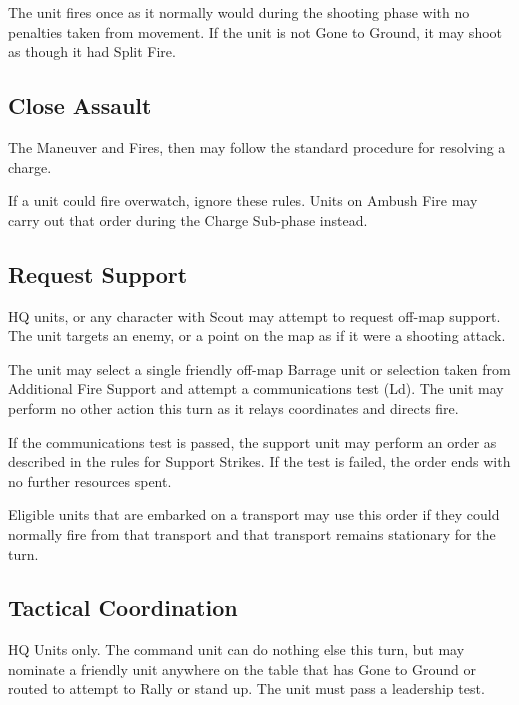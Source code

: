 \documentclass[letterpaper,twocolumn,oneside,titlepage]{book}
\begin{document}
The unit fires once as it normally would during the shooting phase with
no penalties taken from movement. If the unit is not Gone to Ground, it
may shoot as though it had Split Fire.

\subsection{\texorpdfstring{\textbf{Close
Assault}}{Close Assault}}\label{close-assault}

The Maneuver and Fires, then may follow the standard procedure for
resolving a charge.

If a unit could fire overwatch, ignore these rules. Units on Ambush Fire
may carry out that order during the Charge Sub-phase instead.

\subsection{\texorpdfstring{\textbf{Request
Support}}{Request Support}}\label{request-support}

HQ units, or any character with Scout may attempt to request off-map
support. The unit targets an enemy, or a point on the map as if it were
a shooting attack.

The unit may select a single friendly off-map Barrage unit or selection
taken from Additional Fire Support and attempt a communications test
(Ld). The unit may perform no other action this turn as it relays
coordinates and directs fire.

If the communications test is passed, the support unit may perform an
order as described in the rules for Support Strikes. If the test is
failed, the order ends with no further resources spent.

Eligible units that are embarked on a transport may use this order if
they could normally fire from that transport and that transport remains
stationary for the turn.

\subsection{\texorpdfstring{\textbf{Tactical
Coordination}}{Tactical Coordination}}\label{tactical-coordination}

HQ Units only. The command unit can do nothing else this turn, but may
nominate a friendly unit anywhere on the table that has Gone to Ground
or routed to attempt to Rally or stand up. The unit must pass a
leadership test.
\end{document}
